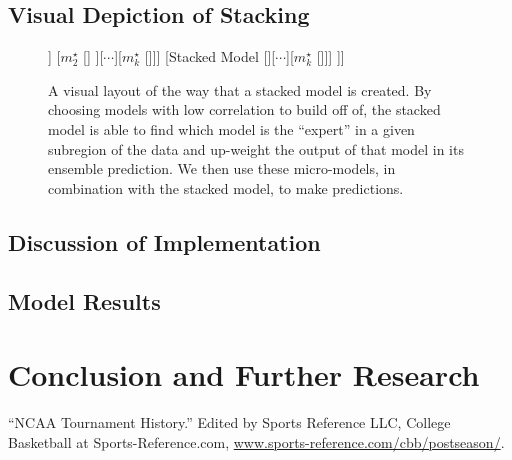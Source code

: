 \documentclass[10pt,a4paper, hidelinks]{article} %
\begin{document}
\subsection{Visual Depiction of Stacking}
\begin{figure}[H]
	\centering
	\begin{forest}
		[Final Predictions [\dattestpreds [\dattest] [$m^\star_1$ [\dattrain]] [$m^\star_2$ [\dattrain] ][$\cdots$][$m^\star_k$ [\dattrain]]] [Stacked Model [\datvaltest [\datval] [$m^\star_1$ [\dattrain]][$\cdots$][$m^\star_k$ [\dattrain]]] ]]
	\end{forest}
\caption{A visual layout of the way that a stacked model is created. By choosing models with low correlation to build off of, the stacked model is able to find which model is the ``expert'' in a given subregion of the data and up-weight the output of that model in its ensemble prediction. We then use these micro-models, in combination with the stacked model, to make predictions. }
\end{figure}



\subsection{Discussion of Implementation}

\subsection{Model Results}

\section{Conclusion and Further Research}

\newpage
\begin{thebibliography}{9}
	
	“NCAA Tournament History.” Edited by Sports Reference LLC, College Basketball at Sports-Reference.com, {\color{blue} \url{www.sports-reference.com/cbb/postseason/}}.
	
\end{thebibliography}
\end{document}

